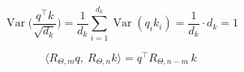 
\[
  \operatorname{Var}\!\Big(\frac{q^\top k}{\sqrt{d_k}}\Big)
  = \frac{1}{d_k}\sum_{i=1}^{d_k}\operatorname{Var}(q_i k_i)
  = \frac{1}{d_k}\cdot d_k = 1
\]

\[
  \langle R_{\Theta,m} q,\ R_{\Theta,n} k\rangle = q^\top R_{\Theta,n-m}\, k
\]
